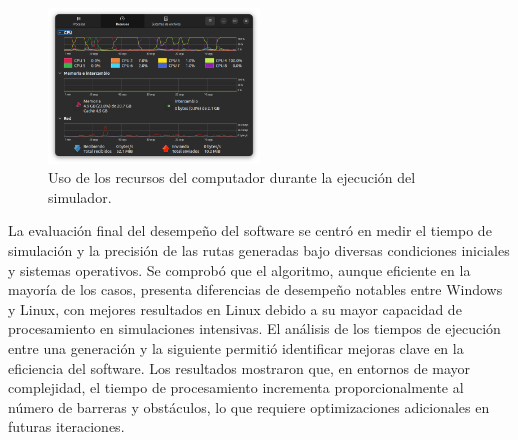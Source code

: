     \vskip 0.5cm
    \begin{figure}[htbp]
        \centering
        \includegraphics[width=0.5\textwidth]{./images/Pruebas/simulador/image083.png}
        \caption{Uso de los recursos del computador durante la ejecuci\'on del simulador.}
        \label{fig:Ruta 83}
    \end{figure}
    \vskip 0.5cm
    La evaluaci\'on final del desempe\~no del software se centr\'o en
        medir el tiempo de simulaci\'on y la precisi\'on de las rutas
        generadas bajo diversas condiciones iniciales y sistemas
        operativos. Se comprob\'o que el algoritmo, aunque eficiente
        en la mayor\'ia de los casos, presenta diferencias de
        desempe\~no notables entre Windows y Linux, con mejores
        resultados en Linux debido a su mayor capacidad de
        procesamiento en simulaciones intensivas.
    \vskip 0.5cm
    El an\'alisis de los tiempos de ejecuci\'on entre una generaci\'on
        y la siguiente permiti\'o identificar mejoras clave en la
        eficiencia del software. Los resultados mostraron que, en
        entornos de mayor complejidad, el tiempo de procesamiento
        incrementa proporcionalmente al n\'umero de barreras y
        obst\'aculos, lo que requiere optimizaciones adicionales en
        futuras iteraciones.